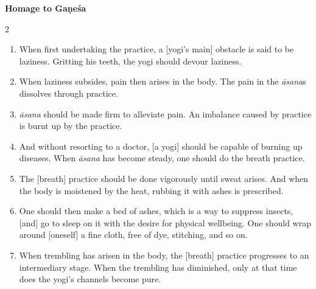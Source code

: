 \newpage
\null\vspace{0.1cm}
\begin{nohyp}
\begin{eng}
\centerline{}
\vskip 7pt

\centerline{{\large\bfseries Homage to Gaṇeśa}}
\end{eng}
\vskip 7pt

\begin{multicols}{2}
\begin{eng}

\begin{enumerate}[nosep]
\item[1.] When first undertaking the practice, a [yogi’s main] obstacle is said to be laziness. Gritting his teeth, the yogi should devour laziness.
\item[2.] When laziness subsides, pain then arises in the body. The pain in the \textit{āsana}s dissolves through practice.
\item[3.] [Each] \textit{āsana} should be made firm to alleviate pain. An imbalance caused by practice is burnt up by the practice.
\item[4.] And without resorting to a doctor, [a yogi] should be capable of burning up diseases.  When \textit{āsana} has become steady, one should do the breath practice.
\item[5.] The [breath] practice should be done vigorously until sweat arises. And when the body is moistened by the heat, rubbing it with ashes is prescribed.
\item[6.]  One should then make a bed of ashes, which is a way to suppress insects, [and] go to sleep on it with the desire for physical wellbeing. One should wrap around [oneself] a fine cloth, free of dye, stitching, and so on.
\item[7.] When trembling has arisen in the body, the [breath] practice progresses to an intermediary stage.  When the trembling has diminished, only at that time does the yogi’s channels become pure.
\end{enumerate}
\vskip 7pt


\end{eng}
\end{multicols}
\end{nohyp}
